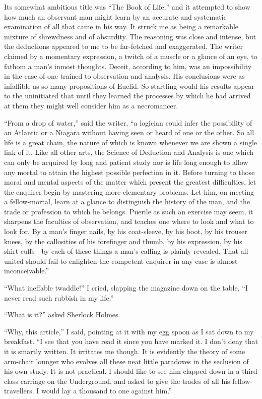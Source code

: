 \documentclass[12pt]{book}
\begin{document}
Its somewhat ambitious title was “The Book of Life,” and it attempted to show how much an observant man might learn by an accurate and systematic examination of all that came in his way. It struck me as being a remarkable mixture of shrewdness and of absurdity. The reasoning was close and intense, but the deductions appeared to me to be far-fetched and exaggerated. The writer claimed by a momentary expression, a twitch of a muscle or a glance of an eye, to fathom a man’s inmost thoughts. Deceit, according to him, was an impossibility in the case of one trained to observation and analysis. His conclusions were as infallible as so many propositions of Euclid. So startling would his results appear to the uninitiated that until they learned the processes by which he had arrived at them they might well consider him as a necromancer. 

“From a drop of water,” said the writer, “a logician could infer the possibility of an Atlantic or a Niagara without having seen or heard of one or the other. So all life is a great chain, the nature of which is known whenever we are shown a single link of it. Like all other arts, the Science of Deduction and Analysis is one which can only be acquired by long and patient study nor is life long enough to allow any mortal to attain the highest possible perfection in it. Before turning to those moral and mental aspects of the matter which present the greatest difficulties, let the enquirer begin by mastering more elementary problems. Let him, on meeting a fellow-mortal, learn at a glance to distinguish the history of the man, and the trade or profession to which he belongs. Puerile as such an exercise may seem, it sharpens the faculties of observation, and teaches one where to look and what to look for. By a man’s finger nails, by his coat-sleeve, by his boot, by his trouser knees, by the callosities of his forefinger and thumb, by his expression, by his shirt cuffs—by each of these things a man’s calling is plainly revealed. That all united should fail to enlighten the competent enquirer in any case is almost inconceivable.” 

“What ineffable twaddle!” I cried, slapping the magazine down on the table, “I never read such rubbish in my life.” 

“What is it?” asked Sherlock Holmes. 

“Why, this article,” I said, pointing at it with my egg spoon as I sat down to my breakfast. “I see that you have read it since you have marked it. I don’t deny that it is smartly written. It irritates me though. It is evidently the theory of some arm-chair lounger who evolves all these neat little paradoxes in the seclusion of his own study. It is not practical. I should like to see him clapped down in a third class carriage on the Underground, and asked to give the trades of all his fellow-travellers. I would lay a thousand to one against him.” 
\end{document}

